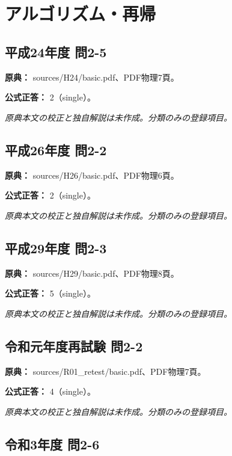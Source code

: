 \section{アルゴリズム・再帰}

\subsection{平成24年度 問2-5}
\label{q:h24-reg-basic-2-5}

\noindent\textbf{原典：} sources/H24/basic.pdf、PDF物理7頁。

\textbf{公式正答：} 2（single）。

\par\textit{原典本文の校正と独自解説は未作成。分類のみの登録項目。}

\subsection{平成26年度 問2-2}
\label{q:h26-reg-basic-2-2}

\noindent\textbf{原典：} sources/H26/basic.pdf、PDF物理6頁。

\textbf{公式正答：} 2（single）。

\par\textit{原典本文の校正と独自解説は未作成。分類のみの登録項目。}

\subsection{平成29年度 問2-3}
\label{q:h29-reg-basic-2-3}

\noindent\textbf{原典：} sources/H29/basic.pdf、PDF物理8頁。

\textbf{公式正答：} 5（single）。

\par\textit{原典本文の校正と独自解説は未作成。分類のみの登録項目。}

\subsection{令和元年度再試験 問2-2}
\label{q:r01-ret-basic-2-2}

\noindent\textbf{原典：} sources/R01\_retest/basic.pdf、PDF物理7頁。

\textbf{公式正答：} 4（single）。

\par\textit{原典本文の校正と独自解説は未作成。分類のみの登録項目。}

\subsection{令和3年度 問2-6}
\label{q:r03-reg-basic-2-6}

